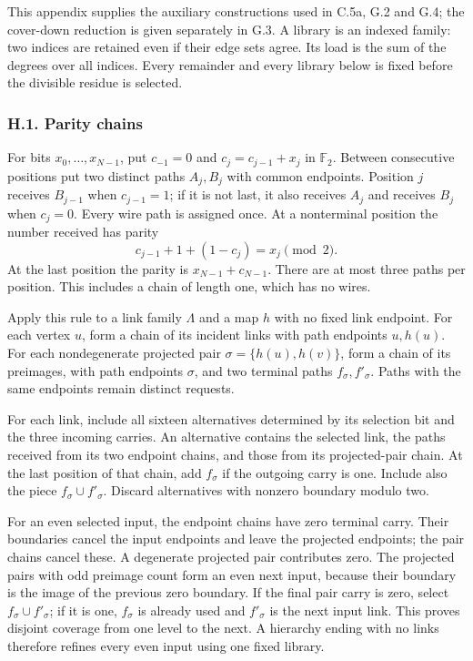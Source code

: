 \documentclass[english,11pt,a4paper]{article}
\begin{document}
This appendix supplies the auxiliary constructions used in C.5a, G.2 and G.4; the cover-down reduction is given separately in G.3. A library is an indexed family: two indices are retained even if their edge sets agree. Its load is the sum of the degrees over all indices. Every remainder and every library below is fixed before the divisible residue is selected.

\subsubsection{H.1. Parity chains}\label{h.1.-parity-chains}

For bits \(x_0,\ldots,x_{N-1}\), put \(c_{-1}=0\) and \(c_j=c_{j-1}+x_j\) in \(\mathbb F_2\). Between consecutive positions put two distinct paths \(A_j,B_j\) with common endpoints. Position \(j\) receives \(B_{j-1}\) when \(c_{j-1}=1\); if it is not last, it also receives \(A_j\) and receives \(B_j\) when \(c_j=0\). Every wire path is assigned once. At a nonterminal position the number received has parity \[c_{j-1}+1+(1-c_j)=x_j\pmod2.\] At the last position the parity is \(x_{N-1}+c_{N-1}\). There are at most three paths per position. This includes a chain of length one, which has no wires.

Apply this rule to a link family \(\Lambda\) and a map \(h\) with no fixed link endpoint. For each vertex \(u\), form a chain of its incident links with path endpoints \(u,h(u)\). For each nondegenerate projected pair \(\sigma=\{h(u),h(v)\}\), form a chain of its preimages, with path endpoints \(\sigma\), and two terminal paths \(f_\sigma,f'_\sigma\). Paths with the same endpoints remain distinct requests.

For each link, include all sixteen alternatives determined by its selection bit and the three incoming carries. An alternative contains the selected link, the paths received from its two endpoint chains, and those from its projected-pair chain. At the last position of that chain, add \(f_\sigma\) if the outgoing carry is one. Include also the piece \(f_\sigma\cup f'_\sigma\). Discard alternatives with nonzero boundary modulo two.

For an even selected input, the endpoint chains have zero terminal carry. Their boundaries cancel the input endpoints and leave the projected endpoints; the pair chains cancel these. A degenerate projected pair contributes zero. The projected pairs with odd preimage count form an even next input, because their boundary is the image of the previous zero boundary. If the final pair carry is zero, select \(f_\sigma\cup f'_\sigma\); if it is one, \(f_\sigma\) is already used and \(f'_\sigma\) is the next input link. This proves disjoint coverage from one level to the next. A hierarchy ending with no links therefore refines every even input using one fixed library.
\end{document}
